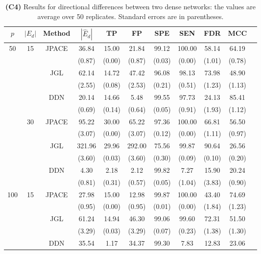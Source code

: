 \documentclass[useAMS,usenatbib,referee]{bio}
\begin{document}
{\begin{table}[htb!]
\caption{{\bf (C4)} Results for directional differences between two dense
networks: the values are average over 50 replicates.
Standard errors are in parentheses.}
\medskip
\centering
{ %
\begin{tabular}{||c|c|c||c|c|c|c|c|c|c||c} \cline{1-10}
$p$  &  $|E_d|$  & Method & $|\hat{E}_d|$ & TP & FP & SPE & SEN & FDR & MCC \\ \hline 
\multirow{12}{*}{50}  &\multirow{6}{*}{15}  & \multirow{2}{*}{JPACE} &36.84 & 15.00 & 21.84 & 99.12 & 100.00 & 58.14 & 64.19 \\ 
& & & (0.87) & (0.00) & (0.87) & (0.03) & (0.00) & (1.01) & (0.78) \\ \cline{3-10} 
& & \multirow{2}{*}{JGL} & 62.14 & 14.72 & 47.42 & 96.08 & 98.13 & 73.98 & 48.90 \\ 
 & & & (2.55) & (0.08) & (2.53) & (0.21) & (0.51) & (1.23) & (1.13) \\ \cline{3-10} 
& & \multirow{2}{*}{DDN} & 20.14 & 14.66 & 5.48 & 99.55 & 97.73 & 24.13 & 85.41 \\ 
 & & & (0.69) & (0.14) & (0.64) & (0.05) & (0.91) & (1.93) & (1.12) \\\cline{2-10} 
  &\multirow{6}{*}{30}  & \multirow{2}{*}{JPACE} &95.22 & 30.00 & 65.22 & 97.36 & 100.00 & 66.81 & 56.50 \\ 
& & & (3.07) & (0.00) & (3.07) & (0.12) & (0.00) & (1.11) & (0.97) \\ \cline{3-10} 
& & \multirow{2}{*}{JGL} & 321.96 & 29.96 & 292.00 & 75.56 & 99.87 & 90.64 & 26.56 \\ 
 & & & (3.60) & (0.03) & (3.60) & (0.30) & (0.09) & (0.10) & (0.20) \\ \cline{3-10} 
& & \multirow{2}{*}{DDN} & 4.30 & 2.18 & 2.12 & 99.82 & 7.27 & 15.90 & 20.24 \\ 
 & & & (0.81) & (0.31) & (0.57) & (0.05) & (1.04) & (3.83) & (0.90) \\\cline{1-10} 
\multirow{12}{*}{100}  &\multirow{6}{*}{15}  & \multirow{2}{*}{JPACE} &27.98 & 15.00 & 12.98 & 99.87 & 100.00 & 43.40 & 74.69 \\ 
& & & (0.95) & (0.00) & (0.95) & (0.01) & (0.00) & (1.84) & (1.23) \\ \cline{3-10} 
& & \multirow{2}{*}{JGL} & 61.24 & 14.94 & 46.30 & 99.06 & 99.60 & 72.31 & 51.50 \\ 
 & & & (3.29) & (0.03) & (3.29) & (0.07) & (0.23) & (1.38) & (1.30) \\ \cline{3-10} 
& & \multirow{2}{*}{DDN} & 35.54 & 1.17 & 34.37 & 99.30 & 7.83 & 12.83 & 23.06 \\ 

\end{tabular}}
\end{table}}
\end{document}
